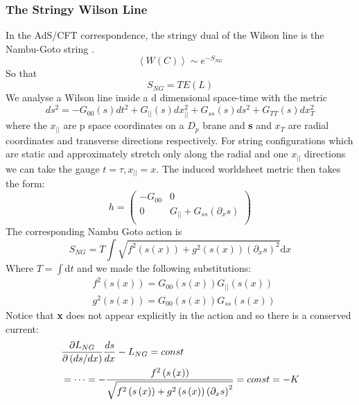 \documentclass[11pt,a4paper]{article}
\begin{document}
\subsubsection{The Stringy Wilson Line}
In the AdS/CFT correspondence, the stringy dual of the Wilson line is the Nambu-Goto string \cite{Maldacena98}.
\begin{equation}
\left\langle W\left(C\right)\right\rangle\sim e^{-S_{NG}}
\end{equation}
So that
\begin{equation}
S_{NG}=TE\left(L\right)
\end{equation}
We analyse a Wilson line inside a d dimensional space-time with the metric \cite{Kinar99}
\begin{equation}
ds^2=-G_{00}\left(s\right)dt^2+G_{||}\left(s\right)dx_{||}^2+G_{ss}\left(s\right)ds^2+G_{TT}\left(s\right)dx_T^2
\end{equation}
where the $x_{||}$ are p space coordinates on a $D_p$ brane and \textbf{s} and $x_T$ are radial coordinates and transverse directions respectively. For string configurations which are static and approximately stretch only along the radial and one $x_{||}$ directions we can take the gauge $t=\tau, x_{||}=x$. The induced worldsheet metric then takes the form:
\begin{equation}
h=
\begin{pmatrix}
-G_{00}	& 0 \\
0		& G_{||}+G_{ss}\left(\partial_{x}s\right) \\ 
\end{pmatrix}
\end{equation} 
The corresponding Nambu Goto action is
\begin{equation}
S_{NG}=T\int\sqrt{f^2\left(s\left(x\right)\right)+g^2\left(s\left(x\right)\right)\left(\partial_xs\right)^2}\mathrm{d}x
\end{equation}
Where $T=\int\mathrm{d}t$ and we made the following substitutions:
\begin{subequations}
\begin{align}
&f^2\left(s\left(x\right)\right)=G_{00}\left(s\left(x\right)\right)G_{||}\left(s\left(x\right)\right)\\
&g^2\left(s\left(x\right)\right)=G_{00}\left(s\left(x\right)\right)G_{ss}\left(s\left(x\right)\right)
\end{align}
\end{subequations}
Notice that \textbf{x} does not appear explicitly in the action and so there is a conserved current:
\begin{align}
&\frac{\partial L_{NG}}{\partial \left(ds/dx\right)}\frac{ds}{dx}-L_{NG}=const \notag \\
&=\cdots=-\frac{f^2\left(s\left(x\right)\right)}{\sqrt{f^2\left(s\left(x\right)\right)+g^2\left(s\left(x\right)\right)\left(\partial_xs\right)^2}}=const=-K
\end{align}
\end{document}
